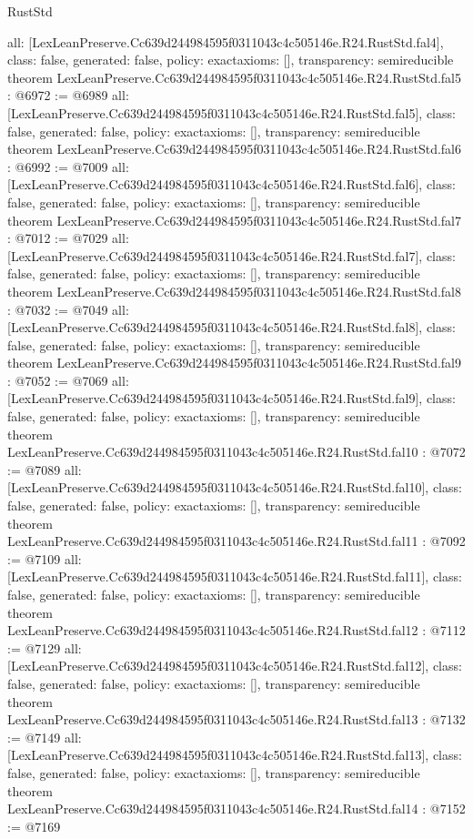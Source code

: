 \begin{lexlean}{RustStd}
\begin{coremodule}
{  all: [LexLeanPreserve.Cc639d244984595f0311043c4c505146e.R24.RustStd.fal4],
  class: false,
  generated: false,
  policy: exact{axioms: []},
  transparency: semireducible
}
theorem LexLeanPreserve.Cc639d244984595f0311043c4c505146e.R24.RustStd.fal5 : @6972 := @6989 {
  all: [LexLeanPreserve.Cc639d244984595f0311043c4c505146e.R24.RustStd.fal5],
  class: false,
  generated: false,
  policy: exact{axioms: []},
  transparency: semireducible
}
theorem LexLeanPreserve.Cc639d244984595f0311043c4c505146e.R24.RustStd.fal6 : @6992 := @7009 {
  all: [LexLeanPreserve.Cc639d244984595f0311043c4c505146e.R24.RustStd.fal6],
  class: false,
  generated: false,
  policy: exact{axioms: []},
  transparency: semireducible
}
theorem LexLeanPreserve.Cc639d244984595f0311043c4c505146e.R24.RustStd.fal7 : @7012 := @7029 {
  all: [LexLeanPreserve.Cc639d244984595f0311043c4c505146e.R24.RustStd.fal7],
  class: false,
  generated: false,
  policy: exact{axioms: []},
  transparency: semireducible
}
theorem LexLeanPreserve.Cc639d244984595f0311043c4c505146e.R24.RustStd.fal8 : @7032 := @7049 {
  all: [LexLeanPreserve.Cc639d244984595f0311043c4c505146e.R24.RustStd.fal8],
  class: false,
  generated: false,
  policy: exact{axioms: []},
  transparency: semireducible
}
theorem LexLeanPreserve.Cc639d244984595f0311043c4c505146e.R24.RustStd.fal9 : @7052 := @7069 {
  all: [LexLeanPreserve.Cc639d244984595f0311043c4c505146e.R24.RustStd.fal9],
  class: false,
  generated: false,
  policy: exact{axioms: []},
  transparency: semireducible
}
theorem LexLeanPreserve.Cc639d244984595f0311043c4c505146e.R24.RustStd.fal10 : @7072 := @7089 {
  all: [LexLeanPreserve.Cc639d244984595f0311043c4c505146e.R24.RustStd.fal10],
  class: false,
  generated: false,
  policy: exact{axioms: []},
  transparency: semireducible
}
theorem LexLeanPreserve.Cc639d244984595f0311043c4c505146e.R24.RustStd.fal11 : @7092 := @7109 {
  all: [LexLeanPreserve.Cc639d244984595f0311043c4c505146e.R24.RustStd.fal11],
  class: false,
  generated: false,
  policy: exact{axioms: []},
  transparency: semireducible
}
theorem LexLeanPreserve.Cc639d244984595f0311043c4c505146e.R24.RustStd.fal12 : @7112 := @7129 {
  all: [LexLeanPreserve.Cc639d244984595f0311043c4c505146e.R24.RustStd.fal12],
  class: false,
  generated: false,
  policy: exact{axioms: []},
  transparency: semireducible
}
theorem LexLeanPreserve.Cc639d244984595f0311043c4c505146e.R24.RustStd.fal13 : @7132 := @7149 {
  all: [LexLeanPreserve.Cc639d244984595f0311043c4c505146e.R24.RustStd.fal13],
  class: false,
  generated: false,
  policy: exact{axioms: []},
  transparency: semireducible
}
theorem LexLeanPreserve.Cc639d244984595f0311043c4c505146e.R24.RustStd.fal14 : @7152 := @7169 {
}
\end{coremodule}
\end{lexlean}
